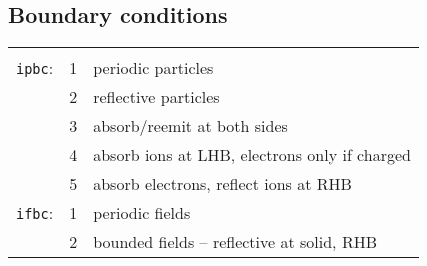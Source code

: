 \documentclass[11pt]{article}
\begin{document}
\subsection{Boundary conditions}
\begin{tabular}{lrl} 
\hline \\
\texttt{ipbc}: & 1 & periodic particles \\ 
	       & 2 & reflective particles\\ 
		& 3 & absorb/reemit at both sides\\ 
		& 4 & absorb ions at LHB, electrons only if charged\\ 
		& 5 & absorb electrons, reflect ions at RHB\\
\texttt{ifbc}: & 1 & periodic fields \\ 
		& 2 & bounded fields -- reflective at solid, RHB
\end{tabular}
 
\end{document}
